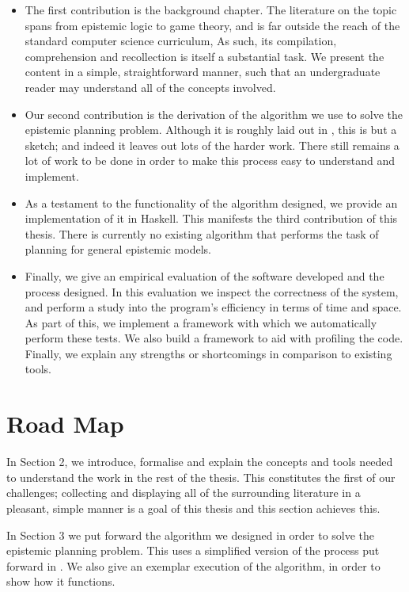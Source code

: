\documentclass[10pt, a4paper]{report}
\begin{document}
\begin{itemize}
\item The first contribution is the background chapter. The literature on the
  topic spans from epistemic logic to game theory, and is far outside the reach
  of the standard computer science curriculum, As such, its compilation,
  comprehension and recollection is itself a substantial task. We present the
  content in a simple, straightforward manner, such that an undergraduate reader
  may understand all of the concepts involved.
\item Our second contribution is the derivation of the algorithm we use to solve
  the epistemic planning problem. Although it is roughly laid out in
  \cite{AutomataTechniques}, this is but a sketch; and indeed it leaves out lots
  of the harder work. There still remains a lot of work to be done in order to
  make this process easy to understand and implement. 
\item As a testament to the functionality of the algorithm designed, we provide
  an implementation of it in Haskell. This manifests the third contribution of
  this thesis. There is currently no existing algorithm that performs the task
  of planning for general epistemic models. 
\item Finally, we give an empirical evaluation of the software developed and the
  process designed. In this evaluation we inspect the correctness of the system,
  and perform a study into the program's efficiency in terms of time and space.
  As part of this, we implement a framework with which we automatically perform
  these tests. We also build a framework to aid with profiling the code.
  Finally, we explain any strengths or shortcomings in comparison to existing
  tools. 
\end{itemize}

\section{Road Map}

In Section 2, we introduce, formalise and explain the concepts and tools needed
to understand the work in the rest of the thesis. This constitutes the first of
our challenges; collecting and displaying all of the surrounding literature in a
pleasant, simple manner is a goal of this thesis and this section achieves this.

In Section 3 we put forward the algorithm we designed in order to solve the
epistemic planning problem. This uses a simplified version of the process put
forward in . We also give an exemplar execution of
the algorithm, in order to show how it functions.
\end{document}
